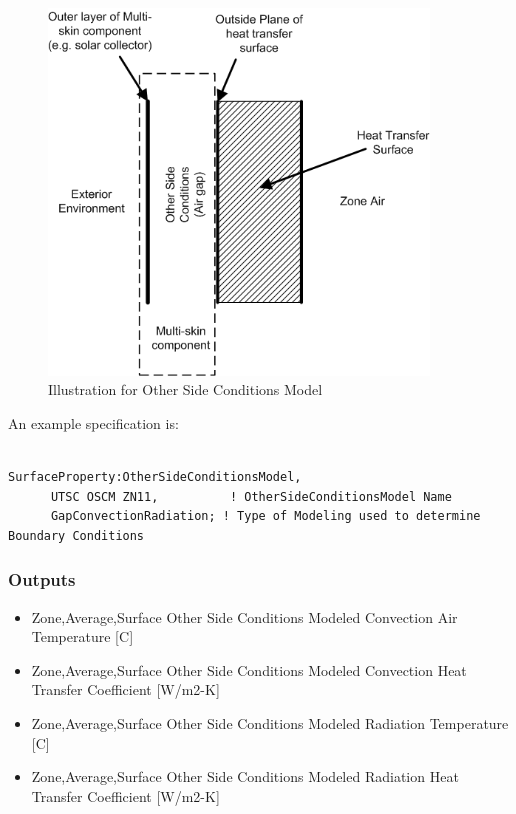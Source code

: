 \begin{figure}[hbtp] %
\centering
\includegraphics[width=0.9\textwidth, height=0.9\textheight, keepaspectratio=true]{media/image070.png}
\caption{Illustration for Other Side Conditions Model \protect \label{fig:illustration-for-other-side-conditions-model}}
\end{figure}

An example specification is:

\begin{lstlisting}

SurfaceProperty:OtherSideConditionsModel,
      UTSC OSCM ZN11,          ! OtherSideConditionsModel Name
      GapConvectionRadiation; ! Type of Modeling used to determine Boundary Conditions
\end{lstlisting}

\subsubsection{Outputs}\label{outputs-1}

\begin{itemize}
\item
  Zone,Average,Surface Other Side Conditions Modeled Convection Air Temperature {[}C{]}
\item
  Zone,Average,Surface Other Side Conditions Modeled Convection Heat Transfer Coefficient {[}W/m2-K{]}
\item
  Zone,Average,Surface Other Side Conditions Modeled Radiation Temperature {[}C{]}
\item
  Zone,Average,Surface Other Side Conditions Modeled Radiation Heat Transfer Coefficient {[}W/m2-K{]}
\end{itemize}

